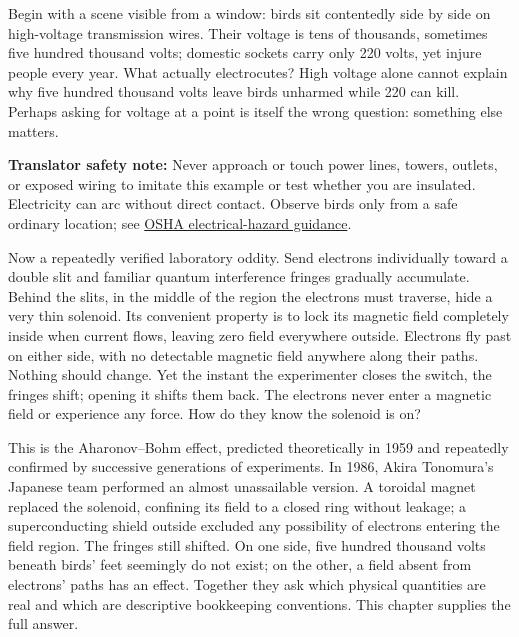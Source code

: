 \begin{mainline}
Begin with a scene visible from a window: birds sit contentedly side by side on high-voltage transmission wires. Their voltage is tens of thousands, sometimes five hundred thousand volts; domestic sockets carry only 220 volts, yet injure people every year. What actually electrocutes? High voltage alone cannot explain why five hundred thousand volts leave birds unharmed while 220 can kill. Perhaps asking for voltage at a point is itself the wrong question: something else matters.

\textbf{Translator safety note:} Never approach or touch power lines, towers, outlets, or exposed wiring to imitate this example or test whether you are insulated. Electricity can arc without direct contact. Observe birds only from a safe ordinary location; see \href{https://www.osha.gov/etools/poultry-processing/plant-wide-hazards/electrical-hazards}{OSHA electrical-hazard guidance}.

Now a repeatedly verified laboratory oddity. Send electrons individually toward a double slit and familiar quantum interference fringes gradually accumulate. Behind the slits, in the middle of the region the electrons must traverse, hide a very thin solenoid. Its convenient property is to lock its magnetic field completely inside when current flows, leaving zero field everywhere outside. Electrons fly past on either side, with no detectable magnetic field anywhere along their paths. Nothing should change. Yet the instant the experimenter closes the switch, the fringes shift; opening it shifts them back. The electrons never enter a magnetic field or experience any force. How do they know the solenoid is on?

This is the Aharonov--Bohm effect, predicted theoretically in 1959 and repeatedly confirmed by successive generations of experiments. In 1986, Akira Tonomura's Japanese team performed an almost unassailable version. A toroidal magnet replaced the solenoid, confining its field to a closed ring without leakage; a superconducting shield outside excluded any possibility of electrons entering the field region. The fringes still shifted. On one side, five hundred thousand volts beneath birds' feet seemingly do not exist; on the other, a field absent from electrons' paths has an effect. Together they ask which physical quantities are real and which are descriptive bookkeeping conventions. This chapter supplies the full answer.
\end{mainline}


